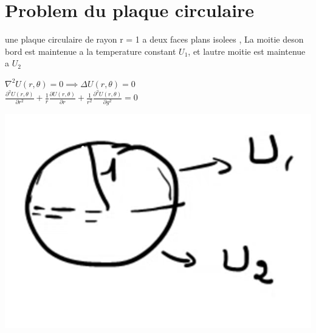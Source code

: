 \documentclass[12pt]{book}
\begin{document}
        \section{Problem du plaque circulaire}
            une plaque circulaire de rayon r = 1 a deux faces plans isolees , La moitie deson bord est maintenue a la temperature constant $ U_1 $, et lautre moitie est maintenue a $ U_2 $ \\
            \begin{minipage}{0.7\linewidth}
                $ \nabla^2U(r,\theta)=0 \implies \Delta U(r,\theta)=0 $ \\
                $ \frac{\partial^2 U(r,\theta)}{\partial r^2}+\frac{1}{r}\frac{\partial U(r,\theta)}{\partial r}+\frac{1}{r^2}\frac{\partial^2U(r,\theta)}{\partial g^2} =0 $
            \end{minipage}
            \begin{minipage}{0.29\linewidth}
                \includegraphics[width=\linewidth]{pic/prob5chap4.png}
            \end{minipage}
\end{document}
